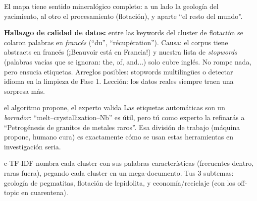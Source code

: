 \documentclass[11pt,a4paper]{article}
\begin{document}
El mapa tiene sentido mineralógico completo: a un lado la geología del yacimiento, al otro el
procesamiento (flotación), y aparte ``el resto del mundo''.

\begin{ojo}
\textbf{Hallazgo de calidad de datos:} entre las keywords del cluster de flotación se colaron
palabras en \emph{francés} (``du'', ``récupération''). Causa: el corpus tiene abstracts en
francés (¡Beauvoir está en Francia!) y nuestra lista de \emph{stopwords} (palabras vacías que
se ignoran: the, of, and...) solo cubre inglés. No rompe nada, pero ensucia etiquetas.
Arreglos posibles: stopwords multilingües o detectar idioma en la limpieza de Fase 1.
Lección: los datos reales siempre traen una sorpresa más.
\end{ojo}

\begin{concepto}{el algoritmo propone, el experto valida}
Las etiquetas automáticas son un \emph{borrador}: ``melt--crystallization--Nb'' es útil, pero
tú como experto la refinarás a ``Petrogénesis de granitos de metales raros''. Esa división de
trabajo (máquina propone, humano cura) es exactamente cómo se usan estas herramientas en
investigación seria.
\end{concepto}

\begin{resumen}
c-TF-IDF nombra cada cluster con sus palabras características (frecuentes dentro, raras
fuera), pegando cada cluster en un mega-documento. Tus 3 subtemas: geología de pegmatitas,
flotación de lepidolita, y economía/reciclaje (con los off-topic en cuarentena).
\end{resumen}
\end{document}
